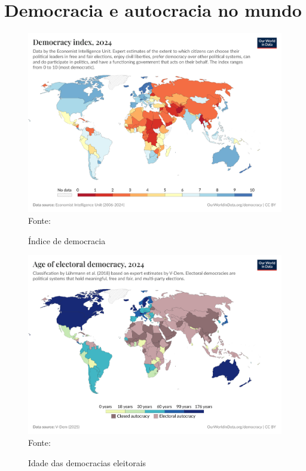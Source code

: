 \section{Democracia e autocracia no mundo}
\label{demo_auto_mundo}

\begin{figure}[ht]
    \centering
    \caption{Índice de democracia}
    \includegraphics[width=1\linewidth]{figuras/democracia/democracy-index-eiu.png}
    \label{fig:democracy-index-eiu}
    \footnotesize{Fonte: \cite{electoral_democracy_eiu}}
\end{figure}

\begin{figure}[ht]
    \centering
    \caption{Idade das democracias eleitorais}
    \includegraphics[width=1\linewidth]{figuras/democracia/age-of-electoral-democracy.png}
    \label{fig:age-of-electoral-democracy}
    \footnotesize{Fonte: \cite{age_electoral_democracy}}
\end{figure}



